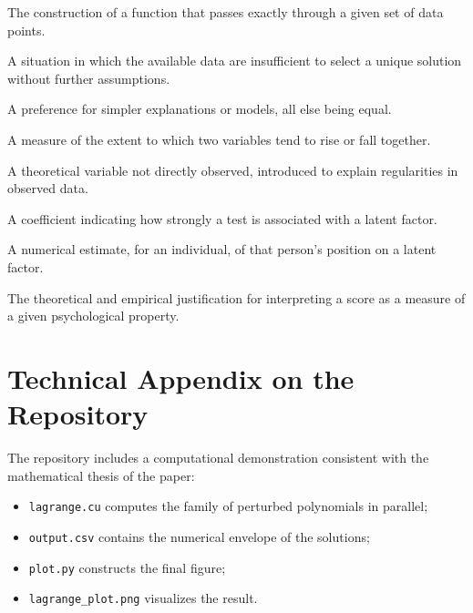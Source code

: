\documentclass[10pt, a4paper]{article}
\theoremstyle{plain}
\theoremstyle{definition}
\theoremstyle{remark}
\begin{document}
\begin{description}[style=nextline, leftmargin=2.7cm]
    \item[Interpolation]
    The construction of a function that passes exactly through a given set of
    data points.

    \item[Underdetermination]
    A situation in which the available data are insufficient to select a unique
    solution without further assumptions.

    \item[Parsimony]
    A preference for simpler explanations or models, all else being equal.

    \item[Correlation]
    A measure of the extent to which two variables tend to rise or fall
    together.

    \item[Latent variable]
    A theoretical variable not directly observed, introduced to explain
    regularities in observed data.

    \item[Factor loading]
    A coefficient indicating how strongly a test is associated with a latent
    factor.

    \item[Factor score]
    A numerical estimate, for an individual, of that person's position on a
    latent factor.

    \item[Construct validity]
    The theoretical and empirical justification for interpreting a score as a
    measure of a given psychological property.
\end{description}

\section*{Technical Appendix on the Repository}

The repository includes a computational demonstration consistent with the
mathematical thesis of the paper:
\begin{itemize}
    \item \texttt{lagrange.cu} computes the family of perturbed polynomials in
          parallel;
    \item \texttt{output.csv} contains the numerical envelope of the solutions;
    \item \texttt{plot.py} constructs the final figure;
    \item \texttt{lagrange\_plot.png} visualizes the result.
\end{itemize}
\end{document}
